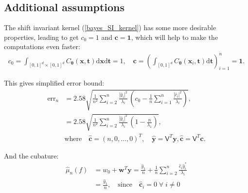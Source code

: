 \documentclass[smallextended]{svjour3}       %
\newcommand{\bm}[1]{\boldsymbol{#1}}
\newcommand{\dif}[1]{\text{d}{#1}}
\newcommand{\vtheta}{{\bm{\theta}}}
\newcommand{\vc}{\bm{c}}
\newcommand{\vt}{\bm{t}}
\newcommand{\vw}{\bm{w}}
\newcommand{\vx}{\bm{x}}
\newcommand{\dvx}{\dif{\bm{x}}}
\newcommand{\dvt}{\dif{\bm{t}}}
\newcommand{\vy}{\bm{y}}
\newcommand{\vone}{\bm{1}}
\newcommand{\mV}{\mathsf{V}}
\newcommand{\hmu}{\hat{\mu}}
\newcommand{\errn}{\text{err}_{n}}
\def\abs#1{\ensuremath{\left \lvert #1 \right \rvert}}
\begin{document}
\subsection{Additional assumptions}
The shift invariant kernel (\ref{bayes_SI_kernel}) has some more desirable properties, leading to get $c_0=1$ and $\vc = \vone$, which will help to make the computations even faster:
\begin{align*}
\displaystyle
c_0 =\int_{[0,1]^d\times [0,1]^d}C_\vtheta(\vx,\vt) \dvx \dvt = 1, \quad \vc = \left( \int_{[0,1]^d}C_\vtheta(\vx_i,\vt) \dvt\right)_{i=1}^n = \vone .
\end{align*}

This gives simplified error bound:
\begin{align*}
\errn &=
2.58\sqrt{
\frac {1}{n^2} \sum_{i=2}^{n} \frac{\abs{\widehat{y}_i}^2}{\lambda_i}  
\,
\left( c_0 - \frac 1n \sum_{i=1}^n \frac{\abs{\widehat{c}_i}^2}{\lambda_i} \right) 
}, 
\\
&= 
2.58\sqrt{
\frac {1}{n^2} \sum_{i=2}^{n} \frac{\abs{\widehat{y}_i}^2}{\lambda_i}  
\,
\left( 1 - \frac{n}{\lambda_1}  \right) 
}, 
\\
& \text{where} \quad \widehat{\vc} = (n,0,...,0)^T, \quad 
\widehat{\vy} = \mV^T \vy,  
\widehat{\vc} = \mV^T \vc. 
\end{align*}


And the cubature:
\begin{align*}
\nonumber
\hmu_n(f) &= w_0 + \vw^T \vy 
= 
\frac{\widehat{y}_1}{n} +
\frac 1n \sum_{i=2}^n \frac{ \widehat{c}_i \widehat{y}_i^*}{\lambda_i} \\
& = \frac{\widehat{y}_1}{n}, \quad \text{since} \quad
 \widehat{\vc}_i=0 \; \forall \; i \neq 0
\end{align*}
\end{document}
